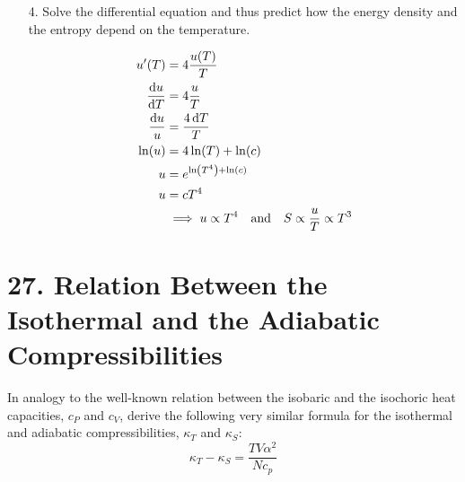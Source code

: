 \documentclass[a4paper,twoside]{article}
\begin{document}
\begin{itemize}
\begin{problem}
\begin{equation}
            \end{equation}
        \end{problem}
    \item[4.] Solve the differential equation and thus predict how the energy density and the entropy depend on the temperature.
        \begin{problem}
            \begin{align}
                u'(T) &= 4 \frac{u(T)}{T} \\
                \dv{u}{T} &= 4 \frac{u}{T} \\
                \frac{\dd{u}}{u} &= \frac{4 \dd{T}}{T} \\
                \ln(u) &= 4\ln(T) + \ln(c) \\
                u &= e^{\ln\left( T^4 \right) + \ln(c)} \\
                u &= cT^4 \\
                &\implies u \propto T^4 \qand S \propto \frac{u}{T} \propto T^3
            \end{align}
        \end{problem}
\end{itemize}


\section*{27. Relation Between the Isothermal and the Adiabatic Compressibilities}
In analogy to the well-known relation between the isobaric and the isochoric heat capacities, $ c_P $ and $ c_V $, derive the following very similar formula for the isothermal and adiabatic compressibilities, $ \kappa_T $ and $ \kappa_S $:
\begin{equation}
    \kappa_T - \kappa_S = \frac{TV \alpha^2}{N c_p}
\end{equation}
\end{document}
